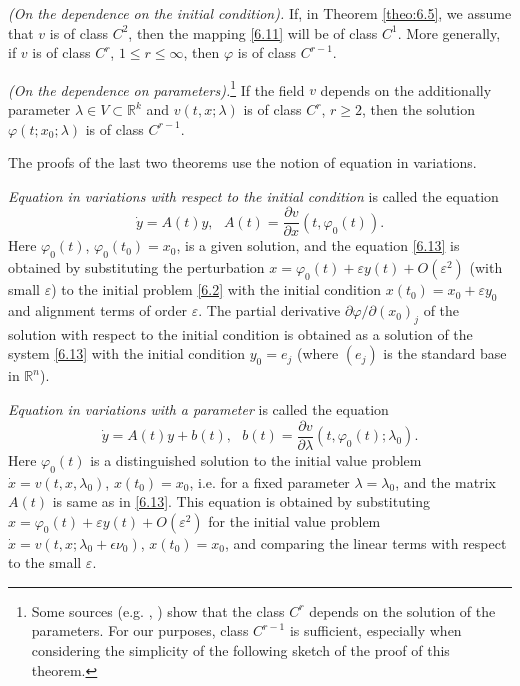 \begin{theorem}\label{theo:6.7}
	\emph{(On the dependence on the initial condition).}
	If, in Theorem \ref{theo:6.5}, we assume that $v$ is of class $C^2$, then the mapping \eqref{6.11} will be of class $C^1$. More generally, if $v$ is of class $C^r$, $1 \leq r \leq \infty$, then $\varphi $ is of class $C^{r-1}$.
\end{theorem}

\begin{theorem}\label{theo:6.8}
	\emph{(On the dependence on parameters).}\footnote{Some sources (e.g. \cite{Hart}, \cite{Hale}) show that the class $C^r$ depends on the solution of the parameters. For our purposes, class $C^{r-1}$ is sufficient, especially when considering the simplicity of the following sketch of the proof of this theorem.}
	If the field $v$ depends on the additionally parameter $\lambda \in V\subset \mathbb{R}^{k}$ and $v(t,x;\lambda )$ is of class $C^r$, $r \geq 2$, then the solution $\varphi (t;x_{0};\lambda )$ is of class $C^{r-1}$.
\end{theorem}

The proofs of the last two theorems use the notion of equation in variations.

\emph{Equation in variations with respect to the initial condition} is called the equation
\begin{equation}
\label{6.13}
\dot{y}=A(t)y,\text{ \ \ }A(t)=\frac{\partial v}{\partial x}(t,\varphi
_{0}(t)).
\end{equation}
Here $\varphi _{0}(t)$, $\varphi _{0}(t_{0})=x_{0}$, is a given solution, and the equation \eqref{6.13} is obtained by substituting the perturbation $x= \varphi_{0} (t) + \varepsilon y(t) + O(\varepsilon ^{2})$ (with small $\varepsilon$) to the initial problem \eqref{6.2} with the initial condition $x(t_{0})=x_{0}+\varepsilon y_{0}$ and alignment terms of order $\varepsilon$. The partial derivative $\partial \varphi /\partial (x_{0})_{j}$ of the solution with respect to the initial condition is obtained as a solution of the system \eqref{6.13} with the initial condition $y_{0}=e_{j}$ (where $(e_{j})$ is the standard base in $\mathbb{R}^{n}$).

\emph{Equation in variations with a parameter} is called the equation
\begin{equation}
\label{6.14}
\dot{y}=A(t)y+b(t),\text{ \ \ }b(t)=\frac{\partial v}{\partial \lambda }%
(t,\varphi _{0}(t);\lambda _{0}).
\end{equation}
Here $\varphi _{0}(t)$ is a distinguished solution to the initial value problem $\dot{x}=v(t,x,\lambda _{0})$, $x(t_{0}) = x_{0}$, i.e. for a fixed parameter $\lambda =\lambda _{0}$, and the matrix $A(t)$ is same as in \eqref{6.13}. This equation is obtained by substituting $x=\varphi _{0}(t)+\varepsilon y(t)+O(\varepsilon ^{2})$ for the initial value problem $\dot{x}=v(t,x;\lambda _{0}+\epsilon \nu _{0})$, $x(t_{0})=x_{0}$, and comparing the linear terms with respect to the small $\varepsilon$.

